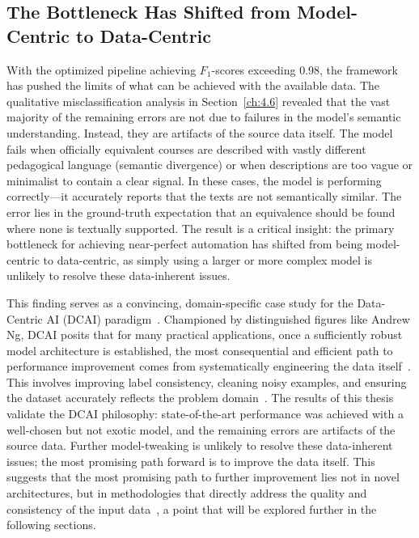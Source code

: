 \subsection{The Bottleneck Has Shifted from Model-Centric to Data-Centric}\label{ch:5.1.3}
With the optimized pipeline achieving \(F_1\)-scores exceeding 0.98, the framework has pushed the limits of what can be achieved with the available data. The qualitative misclassification analysis in Section~\ref{ch:4.6} revealed that the vast majority of the remaining errors are not due to failures in the model's semantic understanding. Instead, they are artifacts of the source data itself. The model fails when officially equivalent courses are described with vastly different pedagogical language (semantic divergence) or when descriptions are too vague or minimalist to contain a clear signal. In these cases, the model is performing correctly—it accurately reports that the texts are not semantically similar. The error lies in the ground-truth expectation that an equivalence should be found where none is textually supported.  The result is a critical insight: the primary bottleneck for achieving near-perfect automation has shifted from being model-centric to data-centric, as simply using a larger or more complex model is unlikely to resolve these data-inherent issues. 

This finding serves as a convincing, domain-specific case study for the Data-Centric AI (DCAI) paradigm~\cite{zha2023datacentricartificialintelligencesurvey,wang2025datacentricaicomprehensivesurvey}. Championed by distinguished figures like Andrew Ng, DCAI posits that for many practical applications, once a sufficiently robust model architecture is established, the most consequential and efficient path to performance improvement comes from systematically engineering the data itself~\cite{ngdatacentric_2021,Strickland_2023}. This involves improving label consistency, cleaning noisy examples, and ensuring the dataset accurately reflects the problem domain~\cite{zha2023datacentricartificialintelligencesurvey,ying2025surveydatacentricaitabular}. The results of this thesis validate the DCAI philosophy: state-of-the-art performance was achieved with a well-chosen but not exotic model, and the remaining errors are artifacts of the source data. Further model-tweaking is unlikely to resolve these data-inherent issues; the most promising path forward is to improve the data itself. This suggests that the most promising path to further improvement lies not in novel architectures, but in methodologies that directly address the quality and consistency of the input data~\cite{gauthier2022}, a point that will be explored further in the following sections.

